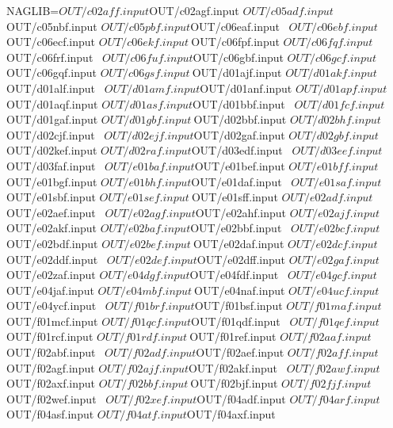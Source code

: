 \documentclass{article}
\begin{document}
NAGLIB=${OUT}/c02aff.input   ${OUT}/c02agf.input     ${OUT}/c05adf.input \
       ${OUT}/c05nbf.input   ${OUT}/c05pbf.input     ${OUT}/c06eaf.input \
       ${OUT}/c06ebf.input   ${OUT}/c06ecf.input     ${OUT}/c06ekf.input \
       ${OUT}/c06fpf.input   ${OUT}/c06fqf.input     ${OUT}/c06frf.input \
       ${OUT}/c06fuf.input   ${OUT}/c06gbf.input     ${OUT}/c06gcf.input \
       ${OUT}/c06gqf.input   ${OUT}/c06gsf.input     \
       ${OUT}/d01ajf.input   ${OUT}/d01akf.input     ${OUT}/d01alf.input \
       ${OUT}/d01amf.input   ${OUT}/d01anf.input     ${OUT}/d01apf.input \
       ${OUT}/d01aqf.input   ${OUT}/d01asf.input     ${OUT}/d01bbf.input \
       ${OUT}/d01fcf.input   ${OUT}/d01gaf.input     ${OUT}/d01gbf.input \
       ${OUT}/d02bbf.input   ${OUT}/d02bhf.input     ${OUT}/d02cjf.input \
       ${OUT}/d02ejf.input   ${OUT}/d02gaf.input     ${OUT}/d02gbf.input \
       ${OUT}/d02kef.input   ${OUT}/d02raf.input     ${OUT}/d03edf.input \
       ${OUT}/d03eef.input   ${OUT}/d03faf.input     \
       ${OUT}/e01baf.input   ${OUT}/e01bef.input     ${OUT}/e01bff.input \
       ${OUT}/e01bgf.input   ${OUT}/e01bhf.input     ${OUT}/e01daf.input \
       ${OUT}/e01saf.input   ${OUT}/e01sbf.input     ${OUT}/e01sef.input \
       ${OUT}/e01sff.input   ${OUT}/e02adf.input     ${OUT}/e02aef.input \
       ${OUT}/e02agf.input   ${OUT}/e02ahf.input     ${OUT}/e02ajf.input \
       ${OUT}/e02akf.input   ${OUT}/e02baf.input     ${OUT}/e02bbf.input \
       ${OUT}/e02bcf.input   ${OUT}/e02bdf.input     ${OUT}/e02bef.input \
       ${OUT}/e02daf.input   ${OUT}/e02dcf.input     ${OUT}/e02ddf.input \
       ${OUT}/e02def.input   ${OUT}/e02dff.input     ${OUT}/e02gaf.input \
       ${OUT}/e02zaf.input   ${OUT}/e04dgf.input     ${OUT}/e04fdf.input \
       ${OUT}/e04gcf.input   ${OUT}/e04jaf.input     ${OUT}/e04mbf.input \
       ${OUT}/e04naf.input   ${OUT}/e04ucf.input     ${OUT}/e04ycf.input \
       ${OUT}/f01brf.input   ${OUT}/f01bsf.input     ${OUT}/f01maf.input \
       ${OUT}/f01mcf.input   ${OUT}/f01qcf.input     ${OUT}/f01qdf.input \
       ${OUT}/f01qef.input   ${OUT}/f01rcf.input     ${OUT}/f01rdf.input \
       ${OUT}/f01ref.input   ${OUT}/f02aaf.input     ${OUT}/f02abf.input \
       ${OUT}/f02adf.input   ${OUT}/f02aef.input     ${OUT}/f02aff.input \
       ${OUT}/f02agf.input   ${OUT}/f02ajf.input     ${OUT}/f02akf.input \
       ${OUT}/f02awf.input   ${OUT}/f02axf.input     ${OUT}/f02bbf.input \
       ${OUT}/f02bjf.input   ${OUT}/f02fjf.input     ${OUT}/f02wef.input \
       ${OUT}/f02xef.input   ${OUT}/f04adf.input     ${OUT}/f04arf.input \
       ${OUT}/f04asf.input   ${OUT}/f04atf.input     ${OUT}/f04axf.input \
\end{document}
